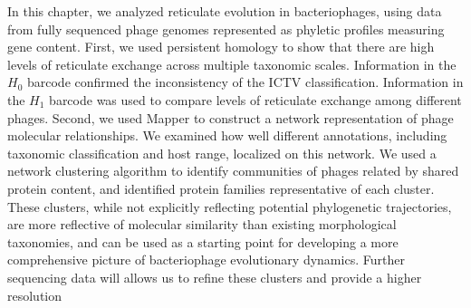 In this chapter, we analyzed reticulate evolution in bacteriophages, using data from fully sequenced phage genomes represented as phyletic profiles measuring gene content.
First, we used persistent homology to show that there are high levels of reticulate exchange across multiple taxonomic scales.
Information in the $H_0$ barcode confirmed the inconsistency of the ICTV classification.
Information in the $H_1$ barcode was used to compare levels of reticulate exchange among different phages.
Second, we used Mapper to construct a network representation of phage molecular relationships.
We examined how well different annotations, including taxonomic classification and host range, localized on this network.
We used a network clustering algorithm to identify communities of phages related by shared protein content, and identified protein families representative of each cluster.
These clusters, while not explicitly reflecting potential phylogenetic trajectories, are more reflective of molecular similarity than existing morphological taxonomies, and can be used as a starting point for developing a more comprehensive picture of bacteriophage evolutionary dynamics.
Further sequencing data will allows us to refine these clusters and provide a higher resolution 
